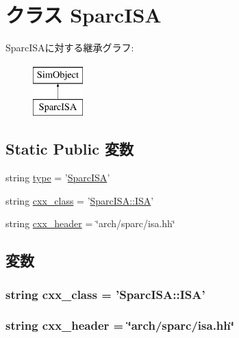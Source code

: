 \hypertarget{classSparcISA_1_1SparcISA}{
\section{クラス SparcISA}
\label{classSparcISA_1_1SparcISA}
}
SparcISAに対する継承グラフ:\begin{figure}[H]
\begin{center}
\leavevmode
\includegraphics[height=2cm]{classSparcISA_1_1SparcISA}
\end{center}
\end{figure}
\subsection*{Static Public 変数}
\begin{DoxyCompactItemize}
\item 
string \hyperlink{classSparcISA_1_1SparcISA_acce15679d830831b0bbe8ebc2a60b2ca}{type} = '\hyperlink{classSparcISA_1_1SparcISA}{SparcISA}'
\item 
string \hyperlink{classSparcISA_1_1SparcISA_a58cd55cd4023648e138237cfc0822ae3}{cxx\_\-class} = '\hyperlink{classSparcISA_1_1ISA}{SparcISA::ISA}'
\item 
string \hyperlink{classSparcISA_1_1SparcISA_a17da7064bc5c518791f0c891eff05fda}{cxx\_\-header} = \char`\"{}arch/sparc/isa.hh\char`\"{}
\end{DoxyCompactItemize}


\subsection{変数}
\hypertarget{classSparcISA_1_1SparcISA_a58cd55cd4023648e138237cfc0822ae3}{
\subsubsection[{cxx\_\-class}]{\setlength{\rightskip}{0pt plus 5cm}string {\bf cxx\_\-class} = '{\bf SparcISA::ISA}'}}
\label{classSparcISA_1_1SparcISA_a58cd55cd4023648e138237cfc0822ae3}
\hypertarget{classSparcISA_1_1SparcISA_a17da7064bc5c518791f0c891eff05fda}{
\subsubsection[{cxx\_\-header}]{\setlength{\rightskip}{0pt plus 5cm}string {\bf cxx\_\-header} = \char`\"{}arch/sparc/isa.hh\char`\"{}}}
\label{classSparcISA_1_1SparcISA_a17da7064bc5c518791f0c891eff05fda}



